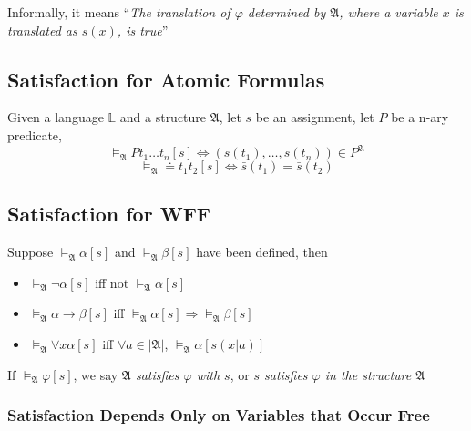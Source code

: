 Informally, it means ``\emph{The translation of $\varphi$ determined by $\mathfrak{A}$, where a variable $x$ is translated as $s(x)$, is true}''

\subsection{Satisfaction for Atomic Formulas}

\begin{definition}
    Given a language $\mathbb{L}$ and a structure $\mathfrak{A}$, let $s$ be an assignment, let $P$ be a n-ary predicate,
    \[ \vDash_{\mathfrak{A}} Pt_1\dots t_n[s] \Leftrightarrow (\bar{s}(t_1),\dots,\bar{s}(t_n)) \in P^{\mathfrak{A}} \]
    \[ \vDash_{\mathfrak{A}} \doteq t_1t_2[s] \Leftrightarrow \bar{s}(t_1) = \bar{s}(t_2) \]
\end{definition}

\subsection{Satisfaction for WFF}

\begin{definition}
    Suppose $\vDash_{\mathfrak{A}}\alpha[s]$ and $\vDash_{\mathfrak{A}}\beta[s]$ have been defined, then
    \begin{itemize}
        \item $\vDash_{\mathfrak{A}} \neg\alpha[s]$ iff not $\vDash_{\mathfrak{A}}\alpha[s]$
        \item $\vDash_{\mathfrak{A}}\alpha\to\beta[s]$ iff $\vDash_{\mathfrak{A}}\alpha[s]\Longrightarrow\vDash_{\mathfrak{A}}\beta[s]$
        \item $\vDash_{\mathfrak{A}}\forall x \alpha[s]$ iff $\forall a\in|\mathfrak{A}|$, $\vDash_{\mathfrak{A}}\alpha[s(x|a)]$
    \end{itemize}
\end{definition}

If $\vDash_{\mathfrak{A}}\varphi[s]$, we say \emph{$\mathfrak{A}$ satisfies $\varphi$ with $s$}, or \emph{$s$ satisfies $\varphi$ in the structure $\mathfrak{A}$}

\subsubsection{Satisfaction Depends Only on Variables that Occur Free}


